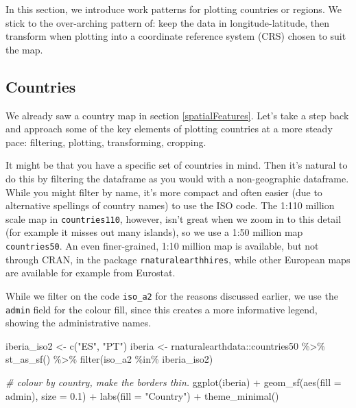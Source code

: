 \documentclass[
]{book}
\newenvironment{Shaded}{\begin{snugshade}}{\end{snugshade}}
\newcommand{\AttributeTok}[1]{\textcolor[rgb]{0.77,0.63,0.00}{#1}}
\newcommand{\CommentTok}[1]{\textcolor[rgb]{0.56,0.35,0.01}{\textit{#1}}}
\newcommand{\FloatTok}[1]{\textcolor[rgb]{0.00,0.00,0.81}{#1}}
\newcommand{\FunctionTok}[1]{\textcolor[rgb]{0.00,0.00,0.00}{#1}}
\newcommand{\NormalTok}[1]{#1}
\newcommand{\OtherTok}[1]{\textcolor[rgb]{0.56,0.35,0.01}{#1}}
\newcommand{\SpecialCharTok}[1]{\textcolor[rgb]{0.00,0.00,0.00}{#1}}
\newcommand{\StringTok}[1]{\textcolor[rgb]{0.31,0.60,0.02}{#1}}
\begin{document}
In this section, we introduce work patterns for plotting countries or regions. We stick to the over-arching pattern of: keep the data in longitude-latitude, then transform when plotting into a coordinate reference system (CRS) chosen to suit the map.

\hypertarget{mapCountries}{%
\subsection{Countries}\label{mapCountries}}

We already saw a country map in section \ref{spatialFeatures}. Let's take a step back and approach some of the key elements of plotting countries at a more steady pace: filtering, plotting, transforming, cropping.

It might be that you have a specific set of countries in mind. Then it's natural to do this by filtering the dataframe as you would with a non-geographic dataframe. While you might filter by name, it's more compact and often easier (due to alternative spellings of country names) to use the ISO code. The 1:110 million scale map in \texttt{countries110}, however, isn't great when we zoom in to this detail (for example it misses out many islands), so we use a 1:50 million map \texttt{countries50}. An even finer-grained, 1:10 million map is available, but not through CRAN, in the package \texttt{rnaturalearthhires}, while other European maps are available for example from Eurostat.

While we filter on the code \texttt{iso\_a2} for the reasons discussed earlier, we use the \texttt{admin} field for the colour fill, since this creates a more informative legend, showing the administrative names.

\begin{Shaded}
\begin{Highlighting}[]
\NormalTok{iberia\_iso2 }\OtherTok{\textless{}{-}} \FunctionTok{c}\NormalTok{(}\StringTok{"ES"}\NormalTok{, }\StringTok{"PT"}\NormalTok{)}
\NormalTok{iberia }\OtherTok{\textless{}{-}}\NormalTok{ rnaturalearthdata}\SpecialCharTok{::}\NormalTok{countries50 }\SpecialCharTok{\%\textgreater{}\%} 
  \FunctionTok{st\_as\_sf}\NormalTok{() }\SpecialCharTok{\%\textgreater{}\%} 
  \FunctionTok{filter}\NormalTok{(iso\_a2 }\SpecialCharTok{\%in\%}\NormalTok{ iberia\_iso2)}

\CommentTok{\# colour by country, make the borders thin.}
\FunctionTok{ggplot}\NormalTok{(iberia) }\SpecialCharTok{+} \FunctionTok{geom\_sf}\NormalTok{(}\FunctionTok{aes}\NormalTok{(}\AttributeTok{fill =}\NormalTok{ admin), }\AttributeTok{size =} \FloatTok{0.1}\NormalTok{) }\SpecialCharTok{+}
  \FunctionTok{labs}\NormalTok{(}\AttributeTok{fill =} \StringTok{"Country"}\NormalTok{) }\SpecialCharTok{+} 
  \FunctionTok{theme\_minimal}\NormalTok{()}
\end{Highlighting}
\end{Shaded}
\end{document}
